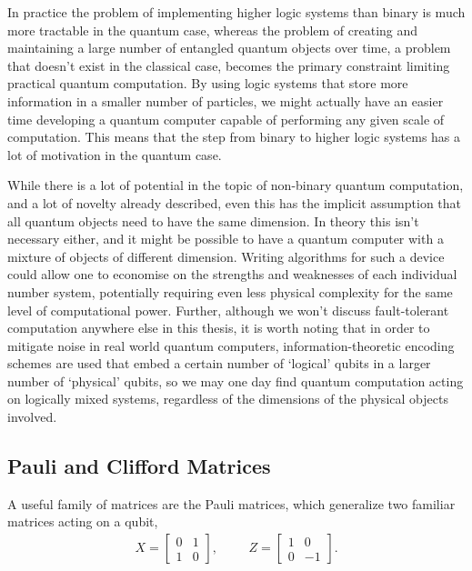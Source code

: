 In practice the problem of implementing higher logic systems than binary is much more tractable in the quantum case, whereas the problem of creating and maintaining a large number of entangled quantum objects over time, a problem that doesn't exist in the classical case, becomes the primary constraint limiting practical quantum computation. By using logic systems that store more information in a smaller number of particles, we might actually have an easier time developing a quantum computer capable of performing any given scale of computation. This means that the step from binary to higher logic systems has a lot of motivation in the quantum case.

While there is a lot of potential in the topic of non-binary quantum computation, and a lot of novelty already described, even this has the implicit assumption that all quantum objects need to have the same dimension. In theory this isn't necessary either, and it might be possible to have a quantum computer with a mixture of objects of different dimension. Writing algorithms for such a device could allow one to economise on the strengths and weaknesses of each individual number system, potentially requiring even less physical complexity for the same level of computational power. Further, although we won't discuss fault-tolerant computation anywhere else in this thesis, it is worth noting that in order to mitigate noise in real world quantum computers, information-theoretic encoding schemes are used that embed a certain number of `logical' qubits in a larger number of `physical' qubits, so we may one day find quantum computation acting on logically mixed systems, regardless of the dimensions of the physical objects involved.

\subsection{Pauli and Clifford Matrices}\label{pauli}
A useful family of matrices are the Pauli matrices, which generalize two familiar matrices acting on a qubit,
\begin{align*}
X = \left[\begin{matrix}
0&1\\
1&0
\end{matrix}\right],
&&&
Z = \left[\begin{matrix}
1&0\\
0&-1
\end{matrix}\right].
\end{align*}


